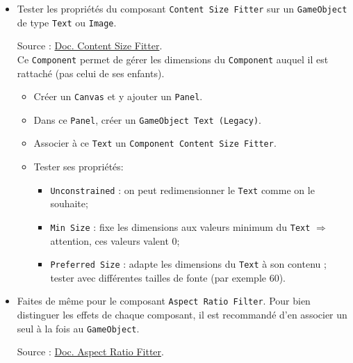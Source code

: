 \documentclass[a4paper,10pt]{article}
\newenvironment{solution}%
{\begin{tcolorbox}[breakable,colback=red!5!white,colframe=red!75!black,title=Solution]}%
{\end{tcolorbox}}
\begin{document}
\begin{itemize}
	  \item Tester les propriétés du  composant \texttt{Content Size Fitter} sur un \texttt{GameObject} de type \texttt{Text} ou \texttt{Image}.
	  
\ifversionenseignant
\begin{solution}
Source : \href{https://docs.unity3d.com/Packages/com.unity.ugui@2.5/manual/script-ContentSizeFitter.html}{Doc. Content Size Fitter}.\\

Ce \texttt{Component} permet de gérer les dimensions du \texttt{Component} auquel il est rattaché (pas celui de ses enfants).

\begin{itemize}
	\item Créer un \texttt{Canvas} et y ajouter un \texttt{Panel}.
	\item Dans ce \texttt{Panel}, créer un \texttt{GameObject Text (Legacy)}.
	\item Associer à ce \texttt{Text} un \texttt{Component Content Size Fitter}.
	\item Tester ses propriétés:
	\begin{itemize}
		\item 	\texttt{Unconstrained} : on peut redimensionner le \texttt{Text} comme on le souhaite;
		\item \texttt{Min Size} : fixe les dimensions aux valeurs minimum du \texttt{Text} $\Rightarrow$ attention, ces valeurs valent 0;
		\item \texttt{Preferred Size} : adapte les dimensions du \texttt{Text} à son contenu ; tester avec différentes tailles de fonte (par exemple 60).		
	\end{itemize}	
\end{itemize}

\end{solution}
\fi 
	  
	  \item Faites de même pour le composant \texttt{Aspect Ratio Filter}. Pour bien distinguer les effets de chaque composant, il est recommandé d'en associer un seul à la fois au \texttt{GameObject}.
	  
\ifversionenseignant
\begin{solution}
	Source : \href{https://docs.unity3d.com/Packages/com.unity.ugui@2.5/manual/script-AspectRatioFitter.html}{Doc. Aspect Ratio Fitter}.
	

\end{solution}
\end{itemize}
\end{document}
